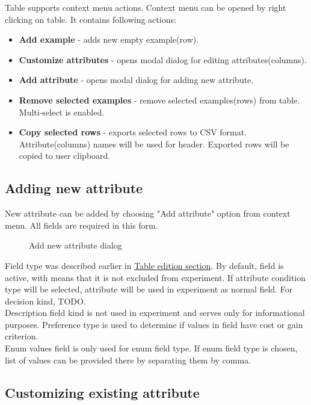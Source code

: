 Table supports context menu actions. Context menu can be opened by right clicking on table. It contains following actions:
\begin{itemize}
	\item \textbf{Add example} - adds new empty example(row).
	\item \textbf{Customize attributes} - opens modal dialog for editing attributes(columns).
	\item \textbf{Add attribute} - opens modal dialog for adding new attribute.
	\item \textbf{Remove selected examples} - remove selected examples(rows) from table. Multi-select is enabled.
	\item \textbf{Copy selected rows} - exports selected rows to CSV format. Attribute(columns) names will be used for header. Exported rows will be copied to user clipboard.
\end{itemize}

\subsection{Adding new attribute}\label{sub:isf-add-attr}

New attribute can be added by choosing "Add attribute" option from context menu. All fields are required in this form.

\begin{figure*}[!ht] 
	\centering
	\caption{Add new attribute dialog}
\end{figure*}

Field type was described earlier in \hyperref[sub:isf-examples]{Table edition section}. By default, field is active, with means that it is not excluded from experiment.
If attribute condition type will be selected, attribute will be used in experiment as normal field. For decision kind, TODO.\\ Description field kind is not used in experiment and serves only for informational purposes. Preference type is used to determine if values in field have cost or gain criterion.\\
Enum values field is only used for enum field type. If enum field type is chosen, list of values can be provided there by separating them by comma.

\subsection{Customizing existing attribute}\label{sub:isf-cust-attr}

